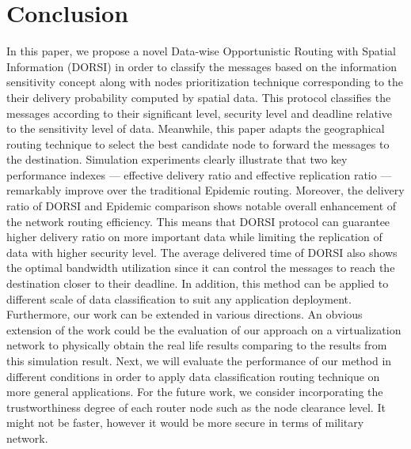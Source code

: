 \section{Conclusion}
\label{DORSI:Conclusion}
In this paper, we propose a novel Data-wise Opportunistic Routing with Spatial Information (DORSI) in order to classify the messages based on the information sensitivity concept along with nodes prioritization technique corresponding to the their delivery probability computed by spatial data. 
This protocol classifies the messages according to their significant level, security level and deadline relative to the sensitivity level of data. 
Meanwhile, this paper adapts the geographical routing technique to select the best candidate node to forward the messages to the destination. 
Simulation experiments clearly illustrate that two key performance indexes — effective delivery ratio and effective replication ratio — remarkably improve over the traditional Epidemic routing. Moreover, the delivery ratio of DORSI and Epidemic comparison shows notable overall enhancement of the network routing efficiency. 
This means that DORSI protocol can guarantee higher delivery ratio on more important data while limiting the replication of data with higher security level. 
The average delivered time of DORSI also shows the optimal bandwidth utilization since it can control the messages to reach the destination closer to their deadline. 
In addition, this method can be applied to different scale of data classification to suit any application deployment. 
Furthermore, our work can be extended in various directions. 
An obvious extension of the work could be the evaluation of our approach on a virtualization network to physically obtain the real life results comparing to the results from this simulation result. 
Next, we will evaluate the performance of our method in different conditions in order to apply data classification routing technique on more general applications.
For the future work, we consider incorporating the trustworthiness degree of each router node such as the node clearance level. 
It might not be faster, however it would be more secure in terms of military network.










































